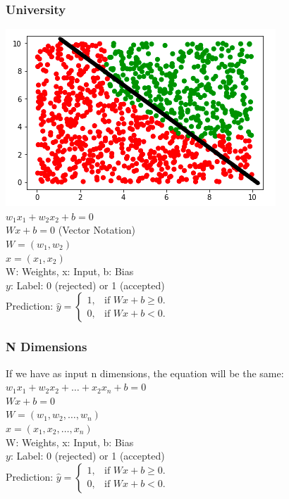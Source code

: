 \begin{frame}[fragile]
  \frametitle{University}
  \includegraphics[scale=0.4]{img/uni_data_2}\\
  \vspace{3mm}
  $w_1x_1+w_2x_2+b=0$\\
  $Wx + b = 0$ (Vector Notation)\\
  $W = (w_1, w_2)$\\
  $x = (x_1, x_2)$\\
  W: Weights, x: Input, b: Bias\\
  $y$: Label: 0 (rejected) or 1 (accepted)\\
  \vspace{3mm}
  Prediction:
  $
  \hat{y}=\begin{cases}
    1, & \text{if $Wx+b \geq 0$}.\\
    0, & \text{if $Wx+b < 0$}.
  \end{cases}
  $
\end{frame}

\begin{frame}[fragile]
  \frametitle{N Dimensions}
  If we have as input n dimensions, the equation will be the same:\\
  $w_1x_1+w_2x_2+\ldots+x_2x_n+b=0$\\
  $Wx + b = 0$\\
  $W = (w_1, w_2, \ldots, w_n)$\\
  $x = (x_1, x_2, \ldots, x_n)$\\
  W: Weights, x: Input, b: Bias\\
  $y$: Label: 0 (rejected) or 1 (accepted)\\
  \vspace{3mm}
  Prediction:
  $
  \hat{y}=\begin{cases}
    1, & \text{if $Wx+b \geq 0$}.\\
    0, & \text{if $Wx+b < 0$}.
  \end{cases}
  $
\end{frame}

